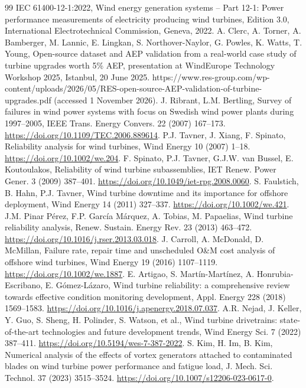 \documentclass[preprint,12pt]{elsarticle}
\begin{document}
\begin{thebibliography}{99}
 IEC 61400-12-1:2022, Wind energy generation systems -- Part 12-1: Power performance measurements of electricity producing wind turbines, Edition 3.0, International Electrotechnical Commission, Geneva, 2022.
 A. Clerc, A. Torner, A. Bamberger, M. Lannic, E. Lingkan, S. Northover-Naylor, G. Powles, K. Watts, T. Young, Open-source dataset and AEP validation from a real-world case study of turbine upgrades worth 5\% AEP, presentation at WindEurope Technology Workshop 2025, Istanbul, 20 June 2025. https://www.res-group.com/wp-content/uploads/2026/05/RES-open-source-AEP-validation-of-turbine-upgrades.pdf (accessed 1 November 2026).
 J. Ribrant, L.M. Bertling, Survey of failures in wind power systems with focus on Swedish wind power plants during 1997--2005, IEEE Trans. Energy Convers. 22 (2007) 167--173. \url{https://doi.org/10.1109/TEC.2006.889614}.
 P.J. Tavner, J. Xiang, F. Spinato, Reliability analysis for wind turbines, Wind Energy 10 (2007) 1--18. \url{https://doi.org/10.1002/we.204}.
 F. Spinato, P.J. Tavner, G.J.W. van Bussel, E. Koutoulakos, Reliability of wind turbine subassemblies, IET Renew. Power Gener. 3 (2009) 387--401. \url{https://doi.org/10.1049/iet-rpg.2008.0060}.
 S. Faulstich, B. Hahn, P.J. Tavner, Wind turbine downtime and its importance for offshore deployment, Wind Energy 14 (2011) 327--337. \url{https://doi.org/10.1002/we.421}.
 J.M. Pinar Pérez, F.P. García Márquez, A. Tobias, M. Papaelias, Wind turbine reliability analysis, Renew. Sustain. Energy Rev. 23 (2013) 463--472. \url{https://doi.org/10.1016/j.rser.2013.03.018}.
 J. Carroll, A. McDonald, D. McMillan, Failure rate, repair time and unscheduled O\&M cost analysis of offshore wind turbines, Wind Energy 19 (2016) 1107--1119. \url{https://doi.org/10.1002/we.1887}.
 E. Artigao, S. Martín-Martínez, A. Honrubia-Escribano, E. Gómez-Lázaro, Wind turbine reliability: a comprehensive review towards effective condition monitoring development, Appl. Energy 228 (2018) 1569--1583. \url{https://doi.org/10.1016/j.apenergy.2018.07.037}.
 A.R. Nejad, J. Keller, Y. Guo, S. Sheng, H. Polinder, S. Watson, et al., Wind turbine drivetrains: state-of-the-art technologies and future development trends, Wind Energy Sci. 7 (2022) 387--411. \url{https://doi.org/10.5194/wes-7-387-2022}.
 S. Kim, H. Im, B. Kim, Numerical analysis of the effects of vortex generators attached to contaminated blades on wind turbine power performance and fatigue load, J. Mech. Sci. Technol. 37 (2023) 3515--3524. \url{https://doi.org/10.1007/s12206-023-0617-0}.

\end{thebibliography}
\end{document}
